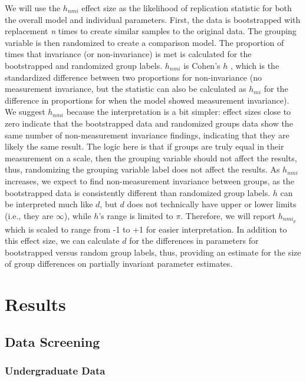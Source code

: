 \documentclass[
  english,
  man]{apa6}
\begin{document}
We will use the \(h_{nmi}\) effect size as the likelihood of replication
statistic for both the overall model and individual parameters. First,
the data is bootstrapped with replacement \emph{n} times to create similar
samples to the original data. The grouping variable is then randomized
to create a comparison model. The proportion of times that invariance
(or non-invariance) is met is calculated for the bootstrapped and
randomized group labels. \(h_{nmi}\) is Cohen's \(h\) , which is the
standardized difference between two proportions for non-invariance (no
measurement invariance, but the statistic can also be calculated as
\(h_{mi}\) for the difference in proportions for when the model showed
measurement invariance). We suggest \(h_{nmi}\) because the interpretation
is a bit simpler: effect sizes close to zero indicate that the
bootstrapped data and randomized groups data show the same number of
non-measurement invariance findings, indicating that they are likely the
same result. The logic here is that if groups are truly equal in their
measurement on a scale, then the grouping variable should not affect the
results, thus, randomizing the grouping variable label does not affect
the results. As \(h_{nmi}\) increases, we expect to find non-measurement
invariance between groups, as the bootstrapped data is consistently
different than randomized group labels. \(h\) can be interpreted much like
\(d\), but \(d\) does not technically have upper or lower limits (i.e., they
are \(\infty\)), while \(h\)'s range is limited to \(\pi\). Therefore, we will
report \(h_{nmi_p}\) which is scaled to range from -1 to +1 for easier
interpretation. In addition to this effect size, we can calculate \(d\)
for the differences in parameters for bootstrapped versus random group
labels, thus, providing an estimate for the size of group differences on
partially invariant parameter estimates.

\section{Results}\label{results}

\subsection{Data Screening}\label{data-screening}

\subsubsection{Undergraduate Data}\label{undergraduate-data}
\end{document}
